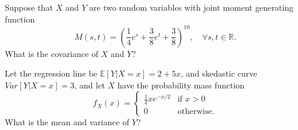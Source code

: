 \begin{mdframed}
    \begin{Exercise}
        Suppose that $X$ and $Y$ are two random variables with joint moment generating function
        \[
            M(s,t) = \left( \frac{1}{4}e^s + \frac{3}{8}e^t + \frac{3}{8}\right)^{10}, \quad \forall s, t \in \mathbb{R}.
        \]
        What is the covariance of $X$ and $Y$?
    \end{Exercise}

    \begin{Exercise}
        Let the regression line be $\mathbb{E}[Y|X = x] = 2 + 5x$, and skedastic curve $Var[Y|X = x] = 3$, and let $X$ have the 
        probability mass function
        \[
            f_X(x) = \begin{cases}
                \displaystyle \frac{1}{4}x e^{-x/2} &\text{if } x > 0\\[0.6em]
                0 &\text{otherwise}.
            \end{cases}
        \]
        What is the mean and variance of $Y$?
    \end{Exercise}
\end{mdframed}